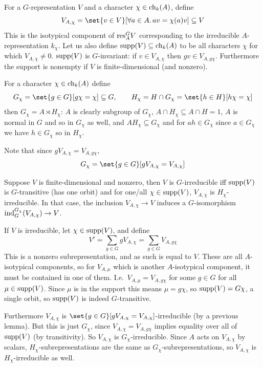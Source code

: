 For a $G$-representation $V$ and a character $\chi\in{\rm ch}_k(A)$, define
$$ V_{A,\chi} = \set{v\in V}[\forall a\in A.\,av=\chi(a)v] \subseteq V $$
This is the isotypical component of ${\rm res}^G_AV$ corresponding to the irreducible $A$-representation $k_\chi$.
Let us also define ${\rm supp}(V)\subseteq{\rm ch}_k(A)$ to be all characters $\chi$ for which $V_{A,\chi}\neq0$.
${\rm supp}(V)$ is $G$-invariant: if $v\in V_{A,\chi}$ then $gv\in V_{A,g\chi}$.
Furthermore the support is nonempty if $V$ is finite-dimensional (and nonzero).

For a character $\chi\in{\rm ch}_k(A)$ define
$$ G_\chi = \set{g\in G}[g\chi=\chi] \subseteq G,\qquad H_\chi = H\cap G_\chi = \set{h\in H}[h\chi=\chi] $$
then $G_\chi=A\rtimes H_\chi$: $A$ is clearly subgroup of $G_\chi$, $A\cap H_\chi\subseteq A\cap H=1$, $A$ is normal in $G$ and so in $G_\chi$ as well, and $AH_\chi\subseteq G_\chi$ and for $ah\in G_\chi$ since
$a\in G_\chi$ we have $h\in G_\chi$ so in $H_\chi$.

Note that since $gV_{A,\chi}=V_{A,g\chi}$,
$$ G_\chi = \set{g\in G}[gV_{A,\chi}=V_{A,\chi}] $$

\blemm

    Suppose $V$ is finite-dimensional and nonzero, then $V$ is $G$-irreducible iff ${\rm supp}(V)$ is $G$-transitive (has one orbit) and for one/all $\chi\in{\rm supp}(V)$, $V_{A,\chi}$ is $H_\chi$-irreducible.
    In that case, the inclusion $V_{A,\chi}\to V$ induces a $G$-isomorphism ${\rm ind}^{G_\chi}_G(V_{A,\chi})\to V$.

\elemm

\bproof

    If $V$ is irreducible, let $\chi\in{\rm supp}(V)$, and define
    $$ V' = \sum_{g\in G}gV_{A,\chi} = \sum_{g\in G}V_{A,g\chi} $$
    This is a nonzero subrepresentation, and as such is equal to $V$.
    These are all $A$-isotypical components, so for $V_{A,\mu}$ which is another $A$-isotypical component, it must be contained in one of them.
    I.e.\ $V_{A,\mu}=V_{A,g\chi}$ for some $g\in G$ for all $\mu\in{\rm supp}(V)$.
    Since $\mu$ is in the support this means $\mu=g\chi$, so ${\rm supp}(V)=G\chi$, a single orbit, so ${\rm supp}(V)$ is indeed $G$-transitive.

    Furthermore $V_{A,\chi}$ is $\set{g\in G}[gV_{A,\chi}=V_{A,\chi}]$-irreducible (by a previous lemma).
    But this is just $G_\chi$, since $V_{A,\chi}=V_{A,g\chi}$ implies equality over all of ${\rm supp}(V)$ (by transitivity).
    So $V_{A,\chi}$ is $G_\chi$-irreducible.
    Since $A$ acts on $V_{A,\chi}$ by scalars, $H_\chi$-subrepresentations are the same as $G_\chi$-subrepresentations, so $V_{A,\chi}$ is $H_\chi$-irreducible as well.

